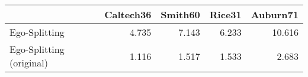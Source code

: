 \begin{tabular}{lrrrr}
\toprule
{} & Caltech36 & Smith60 & Rice31 & Auburn71 \\
\midrule
Ego-Splitting            &     4.735 &   7.143 &  6.233 &   10.616 \\
Ego-Splitting (original) &     1.116 &   1.517 &  1.533 &    2.683 \\
\bottomrule
\end{tabular}
